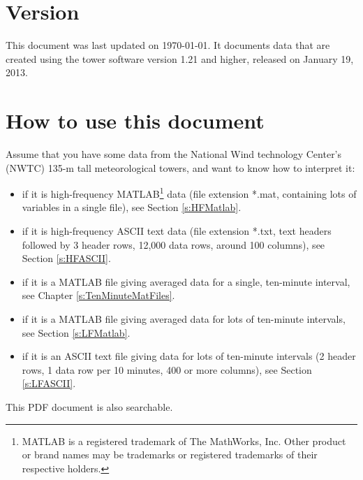 \section{Version}
This document was last updated on \today. It documents data that are created using the tower software version 1.21 and higher, released on January 19, 2013.

\section{How to use this document}
Assume that you have some data from the National Wind technology Center's (NWTC) 135-m tall meteorological towers, and want to know how to interpret it:
\begin{itemize}
\item if it is high-frequency MATLAB\footnote{MATLAB is a registered trademark of The MathWorks, Inc. Other product or brand names may be trademarks or registered trademarks of their respective holders.} data (file extension *.mat, containing lots of variables in a single file), see Section \ref{s:HFMatlab}.
\item if it is high-frequency ASCII text data (file extension *.txt, text headers followed by 3 header rows, 12,000 data rows, around 100 columns), see Section \ref{s:HFASCII}.
\item if it is a MATLAB file giving averaged data for a single, ten-minute interval, see Chapter \ref{s:TenMinuteMatFiles}.
\item if it is a MATLAB file giving averaged data for lots of ten-minute intervals, see Section \ref{s:LFMatlab}.
\item if it is an ASCII text file giving data for lots of ten-minute intervals (2 header rows, 1 data row per 10 minutes, 400 or more columns), see Section \ref{s:LFASCII}.
\end{itemize}

This PDF document is also searchable.
